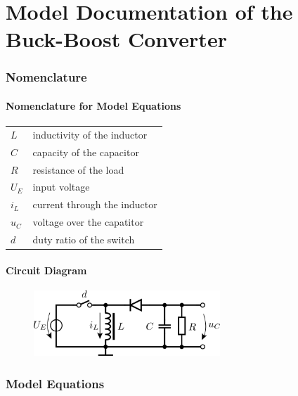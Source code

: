 \documentclass[10pt,a4paper]{article}
\begin{document}
	\part*{Model Documentation of the \\ Buck-Boost Converter} %
	
	
	\section{Nomenclature} %
	\subsection{Nomenclature for Model Equations} %
	
	\begin{tabular}{ll}
		$L$ & inductivity of the inductor \\
		$C$ & capacity of the capacitor \\
		$R$ & resistance of the load \\
		$U_E$ & input voltage \\
		$i_L$ & current through the inductor \\
		$u_C$ & voltage over the capatitor \\
		$d$ & duty ratio of the switch \\

		
				
	\end{tabular}

	\subsection{Circuit Diagram}
	\begin{figure}[H]
		\includegraphics[width=70mm]{buckboost_converter_circuit.pdf}
	\end{figure}	 
	
	
	\section{Model Equations} %
	
\end{document}
